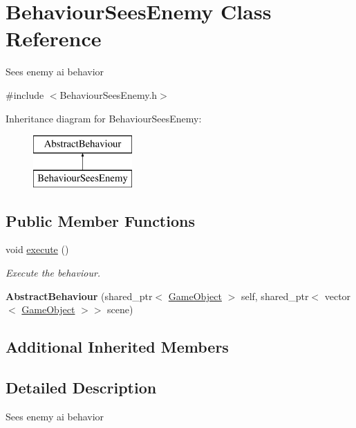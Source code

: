 \hypertarget{class_behaviour_sees_enemy}{}\section{Behaviour\+Sees\+Enemy Class Reference}
\label{class_behaviour_sees_enemy}


Sees enemy ai behavior  




{\ttfamily \#include $<$Behaviour\+Sees\+Enemy.\+h$>$}

Inheritance diagram for Behaviour\+Sees\+Enemy\+:\begin{figure}[H]
\begin{center}
\leavevmode
\includegraphics[height=2.000000cm]{class_behaviour_sees_enemy}
\end{center}
\end{figure}
\subsection*{Public Member Functions}
\begin{DoxyCompactItemize}
\item 
void \mbox{\hyperlink{class_behaviour_sees_enemy_afddbf2ca7396c9fd7b24f4be60edb84c}{execute}} ()
\begin{DoxyCompactList}\small\item\em Execute the behaviour. \end{DoxyCompactList}\item 
\mbox{\label{class_behaviour_sees_enemy_a8a3a9217b3179f949a1d6a32f340c00c}} 
{\bfseries Abstract\+Behaviour} (shared\+\_\+ptr$<$ \mbox{\hyperlink{class_game_object}{Game\+Object}} $>$ self, shared\+\_\+ptr$<$ vector$<$ \mbox{\hyperlink{class_game_object}{Game\+Object}} $>$$>$ scene)
\end{DoxyCompactItemize}
\subsection*{Additional Inherited Members}


\subsection{Detailed Description}
Sees enemy ai behavior 



